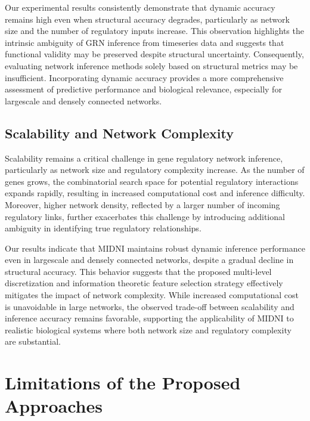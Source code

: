 Our experimental results consistently demonstrate that dynamic accuracy remains high even when structural accuracy degrades, particularly as network size and the number of regulatory inputs increase. This observation highlights the intrinsic ambiguity of GRN inference from timeseries data and suggests that functional validity may be preserved despite structural uncertainty. Consequently, evaluating network inference methods solely based on structural metrics may be insufficient. Incorporating dynamic accuracy provides a more comprehensive assessment of predictive performance and biological relevance, especially for largescale and densely connected networks.
\subsection{Scalability and Network Complexity}
Scalability remains a critical challenge in gene regulatory network inference, particularly as network size and regulatory complexity increase. As the number of genes grows, the combinatorial search space for potential regulatory interactions expands rapidly, resulting in increased computational cost and inference difficulty. Moreover, higher network density, reflected by a larger number of incoming regulatory links, further exacerbates this challenge by introducing additional ambiguity in identifying true regulatory relationships.

Our results indicate that MIDNI maintains robust dynamic inference performance even in largescale and densely connected networks, despite a gradual decline in structural accuracy. This behavior suggests that the proposed multi-level discretization and information theoretic feature selection strategy effectively mitigates the impact of network complexity. While increased computational cost is unavoidable in large networks, the observed trade-off between scalability and inference accuracy remains favorable, supporting the applicability of MIDNI to realistic biological systems where both network size and regulatory complexity are substantial.

\section{Limitations of the Proposed Approaches}
